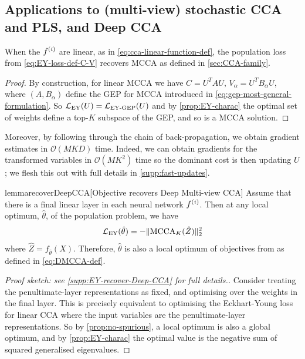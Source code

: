 \subsection{Applications to (multi-view) stochastic CCA and PLS, and Deep CCA}
\begin{lemma}
    When the $f^{(i)}$ are linear, as in \cref{eq:cca-linear-function-def}, the population loss from \cref{eq:EY-loss-def-C-V} recovers MCCA as defined in \cref{sec:CCA-family}. %
\end{lemma}
\begin{proof}
    By construction, for linear MCCA we have $C = U^T A U,\, V_\alpha=U^T B_\alpha U$, where $(A, B_\alpha)$ define the GEP for MCCA introduced in \cref{eq:gep-most-general-formulation}.
    So $\mathcal{L}_\text{EY}(U) = \mathcal{L}_\text{EY-GEP}(U)$ and by \cref{prop:EY-charac} the optimal set of weights define a top-$K$ subspace of the GEP, and so is a MCCA solution.
\end{proof}

Moreover, by following through the chain of back-propagation, we obtain gradient estimates in $\mathcal{O}(MKD)$ time.
Indeed, we can obtain gradients for the transformed variables in $\mathcal{O}(M K^2)$ time so the dominant cost is then updating $U$; we flesh this out with full details in \cref{supp:fast-updates}.

\begin{restatable}{lemma}{recoverDeepCCA}[Objective recovers Deep Multi-view CCA]\label{lem:recover-DeepCCA}
    Assume that there is a final linear layer in each neural network $f^{(i)}$.
    Then at any local optimum, $\hat{\theta}$, of the population problem, we have
    \begin{align*}
        \mathcal{L}_\text{EY}(\hat{\theta}) = - \lVert\operatorname{MCCA}_K(\hat{Z})\rVert_2^2
    \end{align*}
    where $\hat{Z} = f_{\hat{\theta}}(X)$.
    Therefore, $\hat{\theta}$ is also a local optimum of objectives from \cite{andrew2013deep, somandepalli2019multimodal} as defined in \cref{eq:DMCCA-def}.
\end{restatable}
\begin{proof}[Proof sketch: see \cref{supp:EY-recover-Deep-CCA} for full details.]
    Consider treating the penultimate-layer representations as fixed, and optimising over the weights in the final layer. This is precisely equivalent to optimising the Eckhart-Young loss for linear CCA where the input variables are the penultimate-layer representations. So by \cref{prop:no-spurious}, a local optimum is also a global optimum, and by \cref{prop:EY-charac} the optimal value is the negative sum of squared generalised eigenvalues.
\end{proof}


